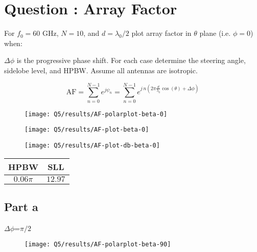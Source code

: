 \documentclass[12pt,onecolumn,a4paper]{article}
\newcommand\question[1][\space]{
	\section[Question \numberstringnum{\thesection}]
	{Question \numberstringnum{\thesection}: #1}
}
\begin{document}
\FloatBarrier\question[Array Factor]

{\color{questioncolor}
For $f_0= 60$ GHz, $N=10$, and $d=\lambda_0/2$ plot array factor in $\theta$ plane (i.e. $\phi=0$) when:

$\Delta\phi$ is the progressive phase shift. For each case determine the steering angle, sidelobe level, and HPBW. Assume all antennas are isotropic.
}




\begin{equation}
	\text{AF} = \sum_{n=0}^{N-1} e^{j \psi_n} = \sum_{n=0}^{N-1} e^{j \, n \left( 2 \pi \frac{d}{\lambda_0} \cos(\theta) + \Delta \phi \right) } 
\end{equation}




\begin{figure}[H]
	\centering
	\texttt{[image: Q5/results/AF-polarplot-beta-0]}
	\caption{}
	\label{fig:af-polarplot-beta-0}
\end{figure}

\begin{figure}[H] 
	\centering
	\texttt{[image: Q5/results/AF-plot-beta-0]}
	\caption{}
	\label{fig:af-plot-beta-0}
\end{figure}

\begin{figure}[H] 
	\centering
	\texttt{[image: Q5/results/AF-plot-db-beta-0]}
	\caption{}
	\label{fig:af-plot-db-beta-0}
\end{figure}


\begin{table}[H]
	\centering
	\begin{tabular}{cc}
		\toprule
		\textbf{HPBW} & \textbf{SLL} \\
		\midrule
		$0.06 \pi$ & $12.97$ \\
		\bottomrule
	\end{tabular}
\end{table}




\subsection{Part a}
{\color{questioncolor} $\Delta\phi$=$\pi/2$
}

\begin{figure}[H]
	\centering
	\texttt{[image: Q5/results/AF-polarplot-beta-90]}
	\caption{}
	\label{fig:af-polarplot-beta-90}
\end{figure}
\end{document}
